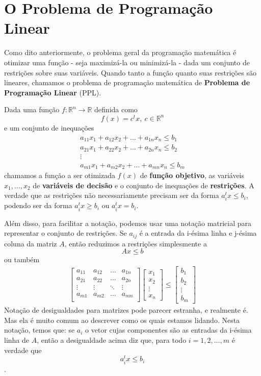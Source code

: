 \section{O Problema de Programação Linear}

Como dito anteriormente, o problema geral da programação matemática é otimizar uma função - seja maximizá-la ou minimizá-la - dada um conjunto de restrições sobre suas variáveis. Quando tanto a função quanto suas restrições são lineares, chamamos o problema de programação matemática de \textbf{Problema de Programação Linear} (PPL). 

Dada uma função $f: \mathbb{R}^n \to \mathbb{R}$ definida como \[f(x) = c^tx,\ c \in \mathbb{R}^n\]e um conjunto de inequações
\begin{gather*}
	a_{11}x_1 + a_{12}x_2 + \ldots + a_{1n}x_n \leq b_1 \\
	a_{21}x_1 + a_{22}x_2 + \ldots + a_{2n}x_n \leq b_2 \\
	\vdots \\
	a_{m1}x_1 + a_{m2}x_2 + \ldots + a_{mn}x_n \leq b_m
\end{gather*} chamamos a função a ser otimizada $f(x)$ de \textbf{função objetivo}, as variáveis $x_1, \ldots, x_2$ de \textbf{variáveis de decisão} e o conjunto de inequações de \textbf{restrições}. A verdade que as restrições não necessariamente precisam ser da forma $a^t_i x \leq b_i$, podendo ser da forma $a^t_i x \geq b_i$ ou  $a^t_i x = b_i$.

Além disso, para facilitar a notação, podemos usar uma notação matricial para representar o conjunto de restrições. Se $a_{ij}$ é a entrada da i-ésima linha e j-ésima coluna da matriz $A$, então reduzimos a restrições simplesmente a \[Ax \leq b\]ou também
\begin{gather*}
\begin{bmatrix}
	a_{11} & a_{12} & \ldots & a_{1n} \\
	a_{21} & a_{22} & \ldots & a_{2n} \\
	\vdots & \vdots & \ddots & \vdots \\
	a_{m1} & a_{m2} & \ldots & a_{mn} \\
\end{bmatrix}
\begin{bmatrix}
	x_1 \\ x_2 \\ \vdots \\ x_n
\end{bmatrix}
\leq
\begin{bmatrix}
	b_1 \\ b_2 \\ \vdots \\ b_m
\end{bmatrix}
\end{gather*}
Notação de desigualdades para matrizes pode parecer estranha, e realmente é. Mas ela é muito comum ao descrever como os quais estamos lidando. Nesta notação, temos que: se $a_{i}$ o vetor cujas componentes são as entradas da i-ésima linha de $A$, então a desigualdade acima diz que, para todo $i=1,2,\ldots,m$ é verdade que \[a^t_ix \leq b_i\].

